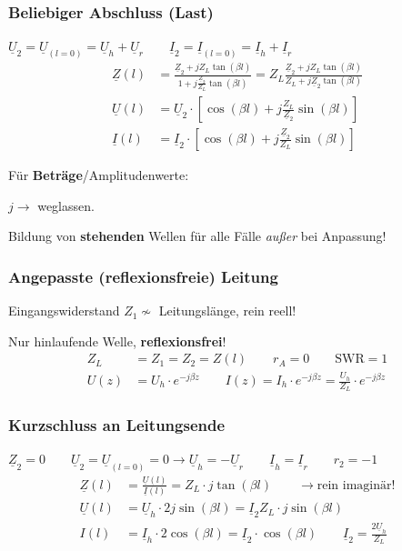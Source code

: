\subsubsection{Beliebiger Abschluss (Last)} \label{beliebig_abschluss}
$\underline{U}_2 = \underline{U}_{(l=0)} =  \underline{U}_h  +\underline{U}_r \qquad \underline{I}_2 = \underline{I}_{(l=0)} =  \underline{I}_h  +\underline{I}_r $
\begin{align*}
	\underline{Z}(l) & =
	\frac{\underline{Z}_2+jZ_L\tan(\beta
		l)}{1+ j \frac{\underline{Z}_2}{Z_L}\tan(\beta l)}
	= Z_L \frac{\underline{Z}_2 + j Z_L \tan(\beta l)}{Z_L + j \underline{Z}_2 \tan(\beta l)}                              \\
	\underline{U}(l) & = \underline{U}_2 \cdot \left[ \cos(\beta l) + j \tfrac{Z_L}{\underline{Z}_2} \sin(\beta l) \right] \\
	\underline{I}(l) & = \underline{I}_2 \cdot \left[ \cos(\beta l) + j \tfrac{\underline{Z}_2}{Z_L} \sin(\beta l) \right]
\end{align*}

Für \textbf{Beträge}/Amplitudenwerte: \quad {}

$j \rightarrow$ weglassen.

\vspace{1em}
Bildung von \textbf{stehenden} Wellen für alle Fälle \textit{außer} bei Anpassung!

\newpage
\subsubsection{Angepasste (reflexionsfreie) Leitung}
Eingangswiderstand $ Z_1\nsim$ Leitungslänge, rein reell!

Nur hinlaufende Welle, \textbf{reflexionsfrei}!
\begin{align*}
	Z_L  & = Z_1 = Z_2 = Z(l) \qquad
	r_A          =0 \qquad
	\mathrm{SWR} = 1                         \\
	U(z) & = U_h\cdot e ^{-j\beta z}  \qquad
	I(z)         = I_h \cdot e^{-j\beta z} = \frac{U_h}{Z_L}\cdot e^{-j\beta z}
\end{align*}

\subsubsection{Kurzschluss an Leitungsende}
$ \underline{Z}_2 = 0 \qquad \underline{U}_2 = \underline{U}_{(l=0)} = 0 \rightarrow \underline{U}_h = - \underline{U}_r \qquad \underline{I}_h = \underline{I}_r \qquad r_2 = -1$
\begin{align*}
	\underline{Z}(l) & = \frac{\underline{U}(l)}{\underline{I}(l)} =  Z_L\cdot j\tan(\beta l)        \qquad \rightarrow \text{rein imaginär!}            \\
	\underline{U}(l) & =  \underline{U}_h  \cdot 2j\sin(\beta l) = \underline{I}_2 Z_L \cdot j\sin(\beta l)                                              \\
	I(l)             & = \underline{I}_h \cdot 2 \cos(\beta l) =\underline{I}_2 \cdot \cos(\beta l) \qquad \underline{I}_2 =\frac{2\underline{U}_h}{Z_L}
\end{align*}

